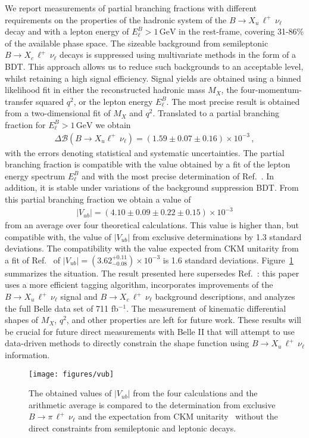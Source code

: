 \documentclass[twocolumn,aps,prd,superscriptaddress,nofootinbib,floatfix,preprintnumbers,a4]{revtex4-1}
\newcommand{\Vub}{V_{ub}}
\newcommand{\bfResd}{\ensuremath{\Delta \mathcal{B}(B \to X_u \ell^+ \, \nu_\ell) = \left( 1.59 \pm 0.07  \pm 0.16 \right) \times 10^{-3}}\xspace}
\newcommand{\bfResAverageVuba}{\ensuremath{\left| V_{ub} \right| = \left( 4.10 \pm 0.09  \pm 0.22 \pm 0.15  \right) \times 10^{-3}}\xspace}
\newcommand{\bulnu}{\ensuremath{B \to X_u \, \ell^+\, \nu_{\ell}}\xspace}
\newcommand{\bclnu}{\ensuremath{B \to X_c \, \ell^+\, \nu_{\ell}}\xspace}
\newcommand{\bpilnu}{\ensuremath{B \to \pi \, \ell^+\,\nu_{\ell}}\xspace}
\begin{document}
We report measurements of partial branching fractions with different requirements on the properties of the hadronic system of the \bulnu decay and with a lepton energy of $E_\ell^B > 1\, \text{GeV}$ in the \PB rest-frame, covering 31-86\% of the available phase space. The sizeable background from semileptonic \bclnu decays is suppressed using multivariate methods in the form of a BDT. This approach allows us to reduce such backgrounds to an acceptable level, whilst retaining a high signal efficiency. Signal yields are obtained using a binned likelihood fit in either the reconstructed hadronic mass $M_X$, the four-momentum-transfer squared $q^2$, or the lepton energy $E_\ell^B$. The most precise result is obtained from a two-dimensional fit of $M_X$ and $q^2$. Translated to a partial branching fraction for $E_\ell^B > 1 \, \text{GeV}$ we obtain
\begin{align}
\bfResd \, ,
\end{align}
with the errors denoting statistical and systematic uncertainties. The partial branching fraction is compatible with the value obtained by a fit of the lepton energy spectrum $E_\ell^B$ and with the most precise determination of Ref.~\cite{TheBABAR:2016lja}. In addition, it is stable under variations of the background suppression BDT. From this partial branching fraction we obtain a value of 
\begin{align}
\bfResAverageVuba
\end{align}
from an average over four theoretical calculations. This value is higher than, but compatible with, the value of $|\Vub|$ from exclusive determinations by 1.3 standard deviations. The compatibility with the value expected from CKM unitarity from a fit of Ref.~\cite{Charles:2004jd} of $|V_{ub}| = \left( 3.62 {}^{+0.11}_{-0.08} \right) \times 10^{-3}$ is 1.6 standard deviations. Figure~\ref{fig:summary} summarizes the situation. The result presented here supersedes Ref.~\cite{Urquijo:2009tp}: this paper uses a more efficient tagging algorithm, incorporates improvements of the \bulnu signal and \bclnu background descriptions, and analyzes the full Belle data set of 711 fb${}^{-1}$. The measurement of kinematic differential shapes of $M_X$, $q^2$, and other properties are left for future work. These results will be crucial for future direct measurements with Belle II that will attempt to use data-driven methods to directly constrain the shape function using \bulnu information. 

\begin{figure}[h!]
 \texttt{[image: figures/vub]} 
\caption{
   The obtained values of $|\Vub|$ from the four calculations and the arithmetic average is compared to the determination from exclusive \bpilnu and the expectation from CKM unitarity~\cite{Charles:2004jd} without the direct constraints from semileptonic and leptonic decays. 
 }
\label{fig:summary}
\end{figure}
\end{document}
